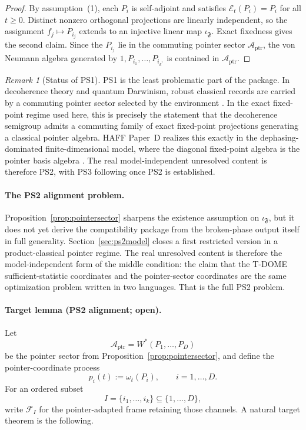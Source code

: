 \documentclass[12pt]{article}
\theoremstyle{definition}
\theoremstyle{remark}
\newtheorem{remark}[theorem]{Remark}
\begin{document}
\begin{proof}
By assumption~(1), each \(P_i\) is self-adjoint and satisfies
\(\mathcal E_t(P_i)=P_i\) for all \(t\ge 0\). Distinct nonzero
orthogonal projections are linearly independent, so the assignment
\(f_j\mapsto P_{i_j}\) extends to an injective linear map
\(\iota_{\mathfrak F}\). Exact fixedness gives the second claim. Since
the \(P_{i_j}\) lie in the commuting pointer sector
\(\mathcal A_{\mathrm{ptr}}\), the von Neumann algebra generated by
\(1,P_{i_1},\dots,P_{i_{k^*}}\) is contained in
\(\mathcal A_{\mathrm{ptr}}\).
\end{proof}

\begin{remark}[Status of PS1]
PS1 is the least problematic part of the package. In decoherence theory
and quantum Darwinism, robust classical records are carried by a
commuting pointer sector selected by the environment
\cite{Zurek2003,Zurek2009}. In the exact fixed-point regime used here,
this is precisely the statement that the decoherence semigroup admits a
commuting family of exact fixed-point projections generating a classical
pointer algebra. HAFF Paper~D realizes this exactly in the
dephasing-dominated finite-dimensional model, where the diagonal
fixed-point algebra is the pointer basis algebra \cite{HAFFD}. The real
model-independent unresolved content is therefore PS2, with PS3
following once PS2 is established.
\end{remark}

\paragraph{The PS2 alignment problem.}
Proposition~\ref{prop:pointersector} sharpens the existence assumption
on \(\iota_{\mathfrak F}\), but it does not yet derive the compatibility
package from the broken-phase output itself in full generality.
Section~\ref{sec:ps2model} closes a first restricted version in a
product-classical pointer regime. The real unresolved content is
therefore the model-independent form of the middle condition: the claim
that the T-DOME sufficient-statistic coordinates and the pointer-sector
coordinates are the same optimization problem written in two languages.
That is the full PS2 problem.

\paragraph{Target lemma (PS2 alignment; open).}
Let
\[
\mathcal A_{\mathrm{ptr}}=W^*(P_1,\dots,P_D)
\]
be the pointer sector from Proposition~\ref{prop:pointersector}, and
define the pointer-coordinate process
\[
p_i(t):=\omega_t(P_i),\qquad i=1,\dots,D.
\]
For an ordered subset
\[
I=\{i_1,\dots,i_k\}\subseteq \{1,\dots,D\},
\]
write \(\mathcal F_I\) for the pointer-adapted frame retaining those
channels. A natural target theorem is the following.
\end{document}
